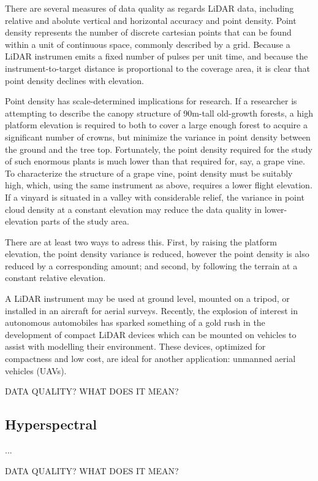 \documentclass[10pt,a4paper]{report}
\begin{document}
There are several measures of data quality as regards LiDAR data, including relative and abolute vertical and horizontal accuracy and point density. Point density represents the number of discrete cartesian points that can be found within a unit of continuous space, commonly described by a grid. Because a LiDAR instrumen emits a fixed number of pulses per unit time, and because the instrument-to-target distance is proportional to the coverage area, it is clear that point density declines with elevation. 

Point density has scale-determined implications for research. If a researcher is attempting to describe the canopy structure of 90m-tall old-growth forests, a high platform elevation is required to both to cover a large enough forest to acquire a significant number of crowns, but minimize the variance in point density between the ground and the tree top. Fortunately, the point density required for the study of such enormous plants is much lower than that required for, say, a grape vine. To characterize the structure of a grape vine, point density must be suitably high, which, using the same instrument as above, requires a lower flight elevation. If a vinyard is situated in a valley with considerable relief, the variance in point cloud density at a constant elevation may reduce the data quality in lower-elevation  parts of the study area.

There are at least two ways to adress this. First, by raising the platform elevation, the point density variance is reduced, however the point density is also reduced by a corresponding amount; and second, by following the terrain at a constant relative elevation.

A LiDAR instrument may be used at ground level, mounted on a tripod, or installed in an aircraft for aerial surveys. Recently, the explosion of interest in autonomous automobiles has sparked something of a gold rush in the development of compact LiDAR devices which can be mounted on vehicles to assist with modelling their environment. These devices, optimized for compactness and low cost, are ideal for another application: unmanned aerial vehicles (UAVs).

DATA QUALITY? WHAT DOES IT MEAN?


\subsection{Hyperspectral}

...


DATA QUALITY? WHAT DOES IT MEAN?
\end{document}
